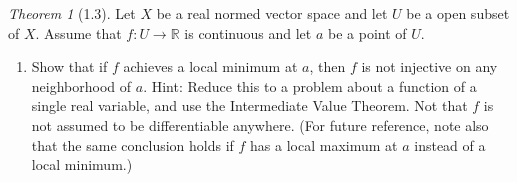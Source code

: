 \documentclass[12pt]{article}
\theoremstyle{remark}
\theoremstyle{named}
\newtheorem*{theorem}{Theorem}
\newcommand{\R}{\mathbb R}
\begin{document}
\begin{theorem}[1.3]
    Let \(X\) be a real normed vector space and let \(U\) be a open subset of \(X\). Assume that \(f : U \to \R\) is continuous and let \(a\) be a point of \(U\). 
    \begin{enumerate}
        \item Show that if \(f\) achieves a local minimum at \(a\), then \(f\) is not injective on any neighborhood of \(a\). Hint: Reduce this to a problem about a function of a single real variable, and use the Intermediate Value Theorem. Not that \(f\) is not assumed to be differentiable anywhere. (For future reference, note also that the same conclusion holds if \(f\) has a local maximum at \(a\) instead of a local minimum.)
    \end{enumerate}
\end{theorem}
\end{document}
